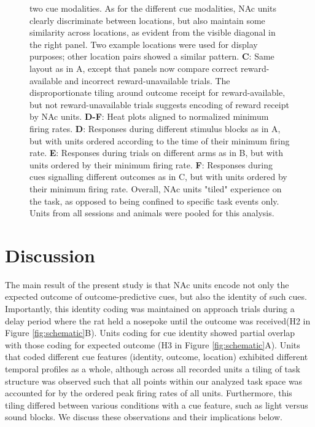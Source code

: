 \documentclass[11pt]{article}
\newcommand{\bsf}[1]{\textbf{#1}}
\providecommand{\DIFadd}[1]{{\protect\color{blue}\uwave{#1}}} %
\providecommand{\DIFaddbegin}{} %
\providecommand{\DIFaddend}{} %
\newcommand{\DIFaddincludegraphics}[2][]{{\color{blue}\fbox{\DIFOincludegraphics[#1]{#2}}}} %
\DeclareRobustCommand{\DIFaddbegin}{\DIFOaddbegin \let\includegraphics\DIFaddincludegraphics} %
\DeclareRobustCommand{\DIFaddend}{\DIFOaddend \let\includegraphics\DIFOincludegraphics} %
\begin{document}
\begin{figure}
{two cue modalities. As for the different cue modalities, NAc units clearly
discriminate between locations, but also maintain some similarity across
locations, as evident from the visible diagonal in the right panel. Two
example locations were used for display purposes; other location pairs showed
a similar pattern. \bsf{C}: Same layout as in A, except that panels now compare
correct reward-available and incorrect reward-unavailable trials. The disproportionate tiling around outcome receipt for reward-available, but not reward-unavailable
trials suggests encoding of reward receipt by NAc units. \bsf{D-F}: Heat plots aligned to normalized minimum firing rates. \bsf{D}: Responses during different stimulus blocks as in A, but with units ordered according to
the time of their minimum firing rate. \bsf{E}: Responses during trials on different arms as in B, but with units ordered by their minimum
firing rate. \bsf{F}: Responses during cues signalling different outcomes as in C, but with units ordered by their minimum firing
rate. Overall, NAc units "tiled" experience on the task, as opposed to being
confined to specific task events only. Units from all sessions and animals
were pooled for this analysis.}
\label{fig:NP_tiling}

\end{figure}
\section*{Discussion}

The main result of the present study is that NAc units encode not
only the expected outcome of outcome-predictive cues, but also the
identity of such cues. Importantly, this identity coding was
maintained on approach trials \DIFaddbegin \DIFadd{both }\DIFaddend during a delay period where the rat held
a nosepoke until the outcome was received\DIFaddbegin \DIFadd{, after immediately after outcome receipt }\DIFaddend (H2 \DIFaddbegin \DIFadd{and H3 }\DIFaddend in Figure
\ref{fig:schematic}B). Units coding for cue identity showed partial
overlap with those coding for expected outcome (H3 in Figure
\ref{fig:schematic}A). Units that coded different cue features
(identity, outcome, location) exhibited different temporal profiles as
a whole, although across all recorded units a tiling of task structure
was observed such that all points within our analyzed task space was
accounted for by the ordered peak firing rates of all
units. Furthermore, this tiling differed between various conditions
with a cue feature, such as light versus sound blocks. We discuss
these observations and their implications below.
\end{document}

